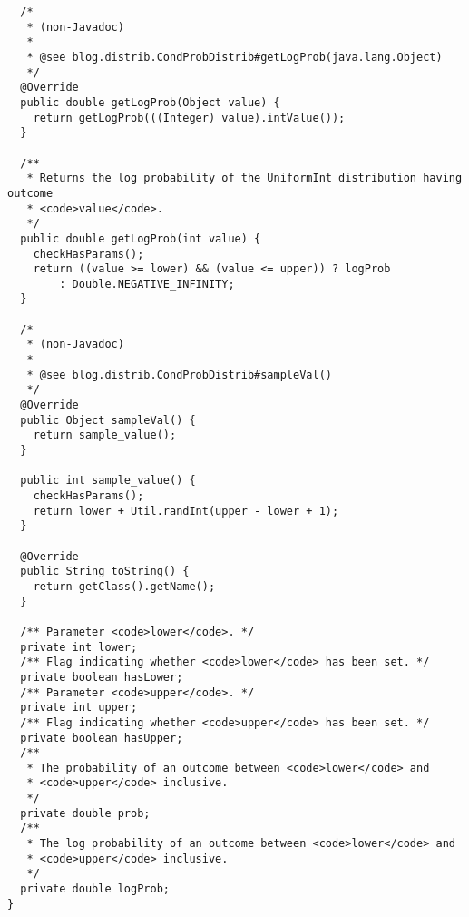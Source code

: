 \begin{verbatim}
  /*
   * (non-Javadoc)
   * 
   * @see blog.distrib.CondProbDistrib#getLogProb(java.lang.Object)
   */
  @Override
  public double getLogProb(Object value) {
    return getLogProb(((Integer) value).intValue());
  }

  /**
   * Returns the log probability of the UniformInt distribution having outcome
   * <code>value</code>.
   */
  public double getLogProb(int value) {
    checkHasParams();
    return ((value >= lower) && (value <= upper)) ? logProb
        : Double.NEGATIVE_INFINITY;
  }

  /*
   * (non-Javadoc)
   * 
   * @see blog.distrib.CondProbDistrib#sampleVal()
   */
  @Override
  public Object sampleVal() {
    return sample_value();
  }

  public int sample_value() {
    checkHasParams();
    return lower + Util.randInt(upper - lower + 1);
  }

  @Override
  public String toString() {
    return getClass().getName();
  }

  /** Parameter <code>lower</code>. */
  private int lower;
  /** Flag indicating whether <code>lower</code> has been set. */
  private boolean hasLower;
  /** Parameter <code>upper</code>. */
  private int upper;
  /** Flag indicating whether <code>upper</code> has been set. */
  private boolean hasUpper;
  /**
   * The probability of an outcome between <code>lower</code> and
   * <code>upper</code> inclusive.
   */
  private double prob;
  /**
   * The log probability of an outcome between <code>lower</code> and
   * <code>upper</code> inclusive.
   */
  private double logProb;
}
\end{verbatim}


